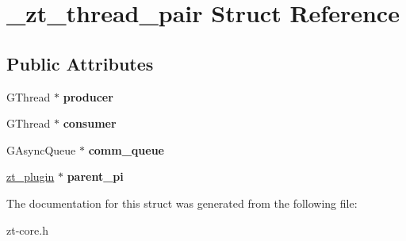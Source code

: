 \hypertarget{struct__zt__thread__pair}{\section{\-\_\-zt\-\_\-thread\-\_\-pair Struct Reference}
\label{struct__zt__thread__pair}
}
\subsection*{Public Attributes}
\begin{DoxyCompactItemize}
\item 
\hypertarget{struct__zt__thread__pair_af652bf228264fc9ea88e517d7926c568}{G\-Thread $\ast$ {\bfseries producer}}\label{struct__zt__thread__pair_af652bf228264fc9ea88e517d7926c568}

\item 
\hypertarget{struct__zt__thread__pair_ad57b3988598e52462856434d234ee84b}{G\-Thread $\ast$ {\bfseries consumer}}\label{struct__zt__thread__pair_ad57b3988598e52462856434d234ee84b}

\item 
\hypertarget{struct__zt__thread__pair_ac4ff9cb97094ff598cb8f2d67b4b99d5}{G\-Async\-Queue $\ast$ {\bfseries comm\-\_\-queue}}\label{struct__zt__thread__pair_ac4ff9cb97094ff598cb8f2d67b4b99d5}

\item 
\hypertarget{struct__zt__thread__pair_a3fbcaafd747983c06006a5f773560110}{\hyperlink{struct__zt__plugin}{zt\-\_\-plugin} $\ast$ {\bfseries parent\-\_\-pi}}\label{struct__zt__thread__pair_a3fbcaafd747983c06006a5f773560110}

\end{DoxyCompactItemize}


The documentation for this struct was generated from the following file\-:\begin{DoxyCompactItemize}
\item 
zt-\/core.\-h\end{DoxyCompactItemize}
